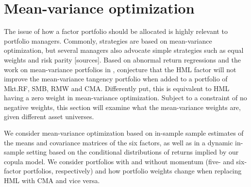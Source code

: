 
\section{Mean-variance optimization}
\label{sec:mean_variance}

The issue of how a factor portfolio should be allocated is highly relevant to portfolio managers. Commonly, strategies are based on mean-variance optimization, but several managers also advocate simple strategies such as equal weights and risk parity [sources]. Based on abnormal return regressions and the work on mean-variance portfolios in \textcite{HubermanKandel1987}, \textcite{FF2015} conjecture that the HML factor will not improve the mean-variance tangency portfolio when added to a portfolio of Mkt.RF, SMB, RMW and CMA. Differently put, this is equivalent to HML having a zero weight in mean-variance optimization. Subject to a constraint of no negative weights, this section will examine what the mean-variance weights are, given different asset universes.

We consider mean-variance optimization based on in-sample sample estimates of the means and covariance matrices of the six factors, as well as in a dynamic in-sample setting based on the conditional distributions of returns implied by our copula model. We consider portfolios with and without momentum (five- and six-factor portfolios, respectively) and how portfolio weights change when replacing HML with CMA and vice versa.



